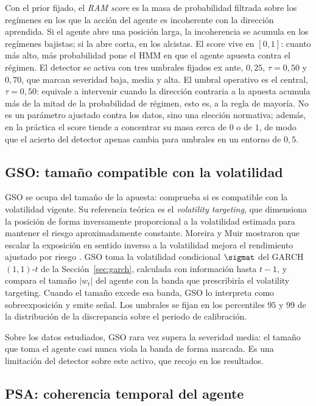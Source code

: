 Con el prior fijado, el \emph{RAM score} es la masa de probabilidad filtrada sobre los regímenes en los que la acción del agente es incoherente con la dirección aprendida. Si el agente abre una posición larga, la incoherencia se acumula en los regímenes bajistas; si la abre corta, en los alcistas. El score vive en $[0,1]$: cuanto más alto, más probabilidad pone el HMM en que el agente apuesta contra el régimen. El detector se activa con tres umbrales fijados ex ante, $0{,}25$, $\tau = 0{,}50$ y $0{,}70$, que marcan severidad baja, media y alta. El umbral operativo es el central, $\tau = 0{,}50$: equivale a intervenir cuando la dirección contraria a la apuesta acumula más de la mitad de la probabilidad de régimen, esto es, a la regla de mayoría. No es un parámetro ajustado contra los datos, sino una elección normativa; además, en la práctica el score tiende a concentrar su masa cerca de $0$ o de $1$, de modo que el acierto del detector apenas cambia para umbrales en un entorno de $0{,}5$.

\subsection{GSO: tamaño compatible con la volatilidad}
\label{sec:strata-gso}

GSO se ocupa del tamaño de la apuesta: comprueba si es compatible con la volatilidad vigente. Su referencia teórica es el \emph{volatility targeting}, que dimensiona la posición de forma inversamente proporcional a la volatilidad estimada para mantener el riesgo aproximadamente constante. Moreira y Muir mostraron que escalar la exposición en sentido inverso a la volatilidad mejora el rendimiento ajustado por riesgo \cite{moreira2017}. GSO toma la volatilidad condicional $\sigmat$ del GARCH$(1,1)$-$t$ de la Sección~\ref{sec:garch}, calculada con información hasta $t-1$, y compara el tamaño $|w_t|$ del agente con la banda que prescribiría el volatility targeting. Cuando el tamaño excede esa banda, GSO lo interpreta como sobreexposición y emite señal. Los umbrales se fijan en los percentiles $95$ y $99$ de la distribución de la discrepancia sobre el periodo de calibración.

Sobre los datos estudiados, GSO rara vez supera la severidad media: el tamaño que toma el agente casi nunca viola la banda de forma marcada. Es una limitación del detector sobre este activo, que recojo en los resultados.

\subsection{PSA: coherencia temporal del agente}
\label{sec:strata-psa}

